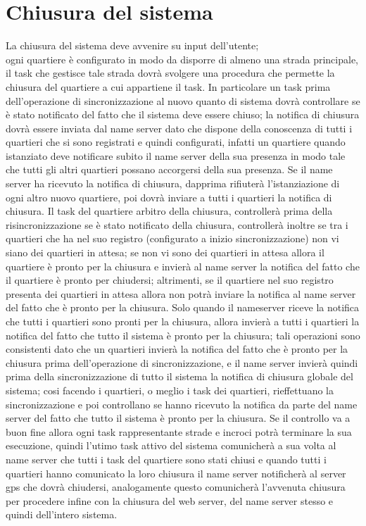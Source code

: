 \section{Chiusura del sistema}
La chiusura del sistema deve avvenire su input dell'utente;\\
ogni quartiere è configurato in modo da disporre di almeno una strada principale, il task che gestisce tale strada dovrà svolgere una procedura che permette la chiusura del quartiere a cui appartiene il task. In particolare un task prima dell'operazione di sincronizzazione al nuovo quanto di sistema dovrà controllare se è stato notificato del fatto che il sistema deve essere chiuso; la notifica di chiusura dovrà essere inviata dal name server dato che dispone della conoscenza di tutti i quartieri che si sono registrati e quindi configurati, infatti un quartiere quando istanziato deve notificare subito il name server della sua presenza in modo tale che tutti gli altri quartieri possano accorgersi della sua presenza. Se il name server ha ricevuto la notifica di chiusura, dapprima rifiuterà l'istanziazione di ogni altro nuovo quartiere, poi dovrà inviare a tutti i quartieri la notifica di chiusura. Il task del quartiere arbitro della chiusura, controllerà prima della risincronizzazione se è stato notificato della chiusura, controllerà inoltre se tra i quartieri che ha nel suo registro (configurato a inizio sincronizzazione) non vi siano dei quartieri in attesa; se non vi sono dei quartieri in attesa allora il quartiere è pronto per la chiusura e invierà al name server la notifica del fatto che il quartiere è pronto per chiudersi; altrimenti, se il quartiere nel suo registro presenta dei quartieri in attesa allora non potrà inviare la notifica al name server del fatto che è pronto per la chiusura. Solo  quando il nameserver riceve la notifica che tutti i quartieri sono pronti per la chiusura, allora invierà a tutti i quartieri la notifica del fatto che tutto il sistema è pronto per la chiusura; tali operazioni sono consistenti dato che un quartieri invierà la notifica del fatto che è pronto per la chiusura prima dell'operazione di sincronizzazione, e il name server invierà quindi prima della sincronizzazione di tutto il sistema la notifica di chiusura globale del sistema; cosi facendo i quartieri, o meglio i task dei quartieri, rieffettuano la sincronizzazione e poi controllano se hanno ricevuto la notifica da parte del name server del fatto che tutto il sistema è pronto per la chiusura. Se il controllo va a buon fine allora ogni task rappresentante strade e incroci potrà terminare la sua esecuzione, quindi l'utimo task attivo del sistema comunicherà a sua volta al name server che tutti i task del quartiere sono stati chiusi e quando tutti i quartieri hanno comunicato la loro chiusura il name server notificherà al server gps che dovrà chiudersi, analogamente questo comunicherà l'avvenuta chiusura per procedere infine con la chiusura del web server, del name server stesso e quindi dell'intero sistema.